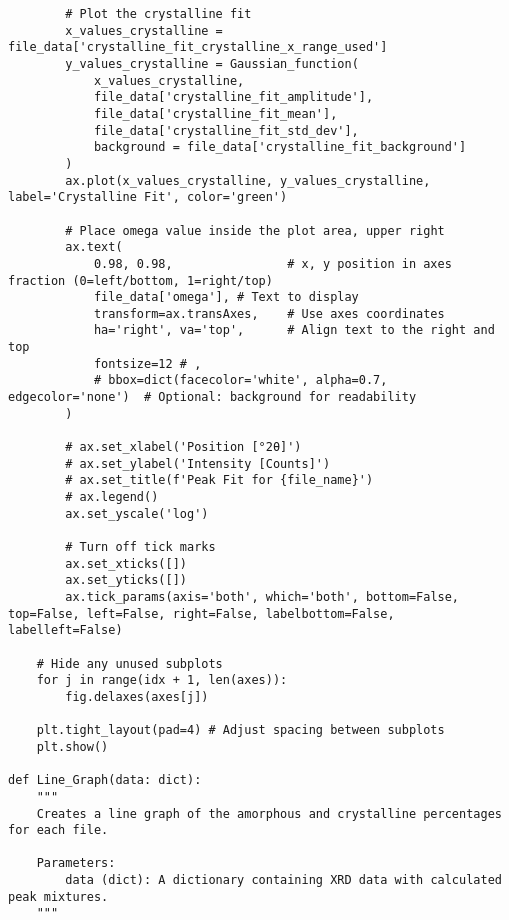 \begin{small}
\begin{verbatim}
        # Plot the crystalline fit
        x_values_crystalline = file_data['crystalline_fit_crystalline_x_range_used']
        y_values_crystalline = Gaussian_function(
            x_values_crystalline,
            file_data['crystalline_fit_amplitude'],
            file_data['crystalline_fit_mean'],
            file_data['crystalline_fit_std_dev'],
            background = file_data['crystalline_fit_background']
        )
        ax.plot(x_values_crystalline, y_values_crystalline, label='Crystalline Fit', color='green')

        # Place omega value inside the plot area, upper right
        ax.text(
            0.98, 0.98,                # x, y position in axes fraction (0=left/bottom, 1=right/top)
            file_data['omega'], # Text to display
            transform=ax.transAxes,    # Use axes coordinates
            ha='right', va='top',      # Align text to the right and top
            fontsize=12 # ,
            # bbox=dict(facecolor='white', alpha=0.7, edgecolor='none')  # Optional: background for readability
        )

        # ax.set_xlabel('Position [°2θ]')
        # ax.set_ylabel('Intensity [Counts]')
        # ax.set_title(f'Peak Fit for {file_name}')
        # ax.legend()
        ax.set_yscale('log')

        # Turn off tick marks
        ax.set_xticks([])
        ax.set_yticks([])
        ax.tick_params(axis='both', which='both', bottom=False, top=False, left=False, right=False, labelbottom=False, labelleft=False)

    # Hide any unused subplots
    for j in range(idx + 1, len(axes)):
        fig.delaxes(axes[j])

    plt.tight_layout(pad=4) # Adjust spacing between subplots
    plt.show()

def Line_Graph(data: dict):
    """
    Creates a line graph of the amorphous and crystalline percentages for each file.

    Parameters:
        data (dict): A dictionary containing XRD data with calculated peak mixtures.
    """


\end{verbatim}
\end{small}
